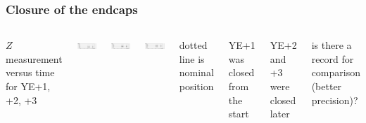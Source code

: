 \documentclass[compress]{beamer}
\begin{document}
\begin{frame}
\frametitle{Closure of the endcaps}
\small
\begin{columns}

$Z$ measurement versus time for YE+1, +2, +3

\includegraphics[width=\linewidth]{timeseries_YEp1.pdf}

\includegraphics[width=\linewidth]{timeseries_YEp2.pdf}

\includegraphics[width=\linewidth]{timeseries_YEp3.pdf}


dotted line is nominal position

\vspace{0.5 cm}
YE+1 was closed from the start

\vspace{0.5 cm}
YE+2 and +3 were closed later

\vspace{0.5 cm}
is there a record for comparison (better precision)?

\end{columns}
\end{frame}
\end{document}
